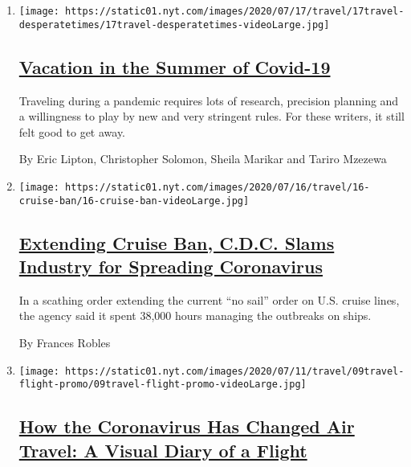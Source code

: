 \begin{enumerate}
\def\labelenumi{\arabic{enumi}.}
\item
  \texttt{[image: https://static01.nyt.com/images/2020/07/17/travel/17travel-desperatetimes/17travel-desperatetimes-videoLarge.jpg]}

  \hypertarget{vacation-in-the-summer-of-covid-19}{%
  \subsection{\texorpdfstring{\href{/2020/07/16/travel/virus-vacation.html}{Vacation
  in the Summer of
  Covid-19}}{Vacation in the Summer of Covid-19}}\label{vacation-in-the-summer-of-covid-19}}

  Traveling during a pandemic requires lots of research, precision
  planning and a willingness to play by new and very stringent rules.
  For these writers, it still felt good to get away.

  By Eric Lipton, Christopher Solomon, Sheila Marikar and Tariro Mzezewa
\item
  \texttt{[image: https://static01.nyt.com/images/2020/07/16/travel/16-cruise-ban/16-cruise-ban-videoLarge.jpg]}

  \hypertarget{extending-cruise-ban-cdc-slams-industry-for-spreading-coronavirus}{%
  \subsection{\texorpdfstring{\href{/2020/07/16/travel/coronavirus-cruise-ban-extended.html}{Extending
  Cruise Ban, C.D.C. Slams Industry for Spreading
  Coronavirus}}{Extending Cruise Ban, C.D.C. Slams Industry for Spreading Coronavirus}}\label{extending-cruise-ban-cdc-slams-industry-for-spreading-coronavirus}}

  In a scathing order extending the current ``no sail'' order on U.S.
  cruise lines, the agency said it spent 38,000 hours managing the
  outbreaks on ships.

  By Frances Robles
\item
  \texttt{[image: https://static01.nyt.com/images/2020/07/11/travel/09travel-flight-promo/09travel-flight-promo-videoLarge.jpg]}

  \hypertarget{how-the-coronavirus-has-changed-air-travel-a-visual-diary-of-a-flight}{%
  \subsection{\texorpdfstring{\href{/interactive/2020/07/09/travel/coronavirus-air-travel-visual-diary.html}{How
  the Coronavirus Has Changed Air Travel: A Visual Diary of a
  Flight}}{How the Coronavirus Has Changed Air Travel: A Visual Diary of a Flight}}\label{how-the-coronavirus-has-changed-air-travel-a-visual-diary-of-a-flight}}


\end{enumerate}
